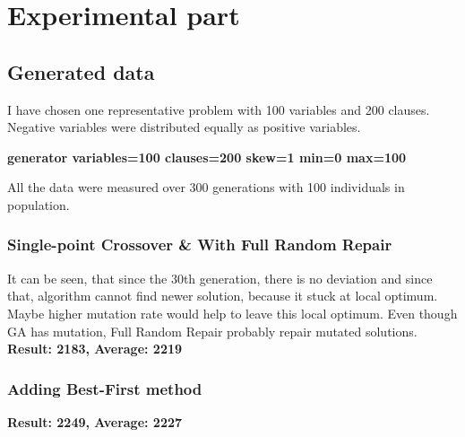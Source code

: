 \documentclass{article}
\begin{document}
\section{Experimental part}

	\subsection{Generated data}
	I have chosen one representative problem with 100 variables and 200 clauses. Negative variables were distributed equally as positive variables.
	\begin{center}
		\textbf{generator \-\-variables=100 \-\-clauses=200 \-\-skew=1 \-\-min=0 \-\-max=100} 
	\end{center}

	\clearpage


	All the data were measured over 300 generations with 100 individuals in population.
	\subsubsection{Single-point Crossover \& With Full Random Repair}
	It can be seen, that since the 30th generation, there is no deviation and since that, algorithm cannot find newer solution, because it stuck at local optimum. Maybe higher mutation rate would help to leave this local optimum. Even though GA has mutation, Full Random Repair probably repair mutated solutions.  
	\textbf{Result: 2183, Average: 2219} 

	\begin{figure}[h!]
		\centering
	\end{figure}

	\clearpage
	\subsubsection{Adding Best-First method}
	\textbf{Result: 2249, Average: 2227}
\end{document}
